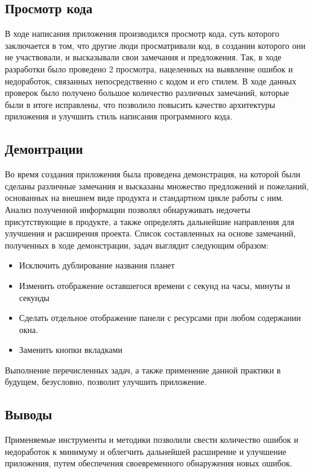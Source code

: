\subsection{Просмотр кода}

В ходе написания приложения производился просмотр кода, суть которого заключается в том, что другие люди просматривали код, в создании которого они не участвовали, и высказывали свои замечания и предложения. Так, в ходе разработки было проведено 2 просмотра, нацеленных на выявление ошибок и недоработок, связанных  непосредственно с кодом и его стилем. В ходе данных проверок было получено большое количество различных замечаний, которые были в итоге исправлены, что позволило повысить качество архитектуры приложения и улучшить стиль написания программного кода.

\subsection{Демонтрации}

Во время создания приложения была проведена демонстрация, на которой были сделаны различные замечания и высказаны множество предложений и пожеланий, основанных на внешнем виде продукта и стандартном цикле работы с ним. Анализ полученной информации позволял обнаруживать недочеты присутствующие в продукте, а также определять дальнейшие направления для улучшения и расширения проекта. Список составленных на основе замечаний, полученных в ходе демонстрации, задач выглядит следующим образом:
\begin{itemize}
\item Исключить дублирование названия планет
\item Изменить отображение оставшегося времени с секунд на часы, минуты и секунды
\item Сделать отдельное отображение панели с ресурсами при любом содержании окна.
\item Заменить кнопки вкладками
\end{itemize}

Выполнение перечисленных задач, а также применение данной практики в будущем, безусловно, позволит улучшить приложение.

\subsection{Выводы}
Применяемые инструменты и методики позволили свести количество ошибок и недоработок к минимуму и облегчить дальнейшей расширение и улучшение приложения, путем обеспечения своевременного обнаружения новых ошибок. 

